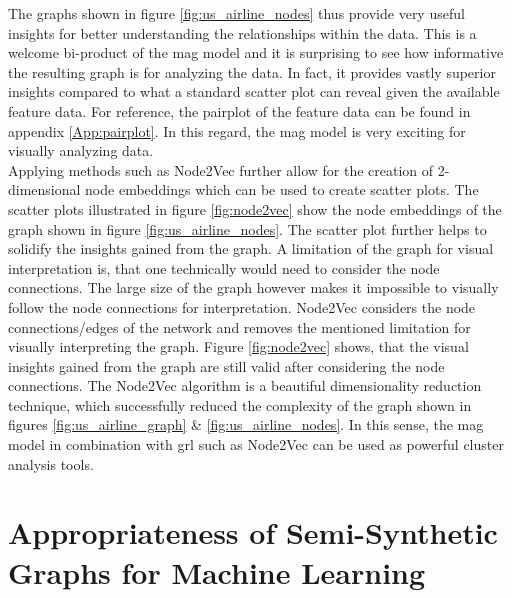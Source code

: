   \noindent The graphs shown in figure \ref{fig:us_airline_nodes} thus provide 
  very useful insights for better understanding the relationships within 
  the data. This is a welcome bi-product of the \acs{mag} model and it is surprising 
  to see how informative the resulting graph is for analyzing the data. In fact, 
  it provides vastly superior insights compared to what a standard scatter plot 
  can reveal given the available feature data. For reference, the pairplot of 
  the feature data can be found in appendix \ref{App:pairplot}. In this regard, 
  the \acs{mag} model is very exciting for visually analyzing data. \\

  \noindent Applying methods such as Node2Vec further allow for the creation
  of 2-dimensional node embeddings which can be used to create scatter plots. The
  scatter plots illustrated in figure \ref{fig:node2vec} show the node embeddings 
  of the graph shown in figure \ref{fig:us_airline_nodes}. The scatter plot further
  helps to solidify the insights gained from the graph. A limitation of the
  graph for visual interpretation is, that one technically would need to
  consider the node connections. The large size of the graph however makes it
  impossible to visually follow the node connections for interpretation. Node2Vec
  considers the node connections/edges of the network and removes the mentioned
  limitation for visually interpreting the graph. Figure \ref{fig:node2vec}
  shows, that the visual insights gained from the graph are still valid after
  considering the node connections. The Node2Vec algorithm is a beautiful
  dimensionality reduction technique, which successfully reduced the complexity
  of the graph shown in figures \ref{fig:us_airline_graph} \& 
  \ref{fig:us_airline_nodes}. In this sense, the \acs{mag} model in combination 
  with \acs{grl} such as Node2Vec can be used as powerful cluster analysis tools.
  
  \section{Appropriateness of Semi-Synthetic Graphs for Machine Learning}
  \label{section:gml_performance}

